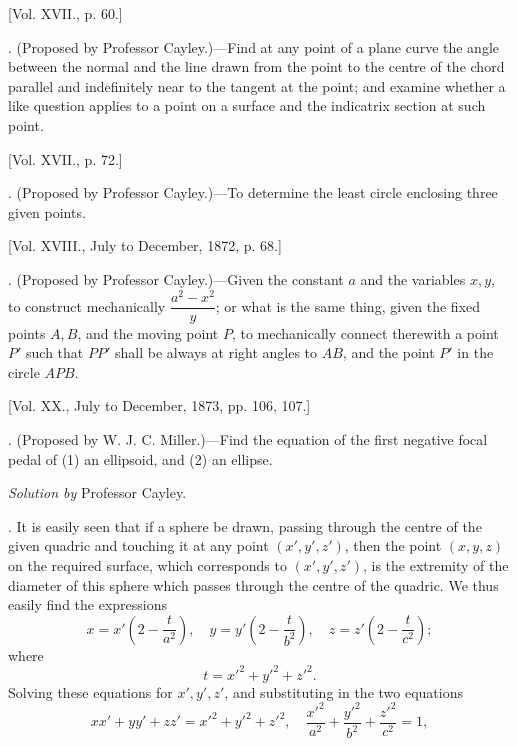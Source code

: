 \documentclass[10pt,twoside]{article}
\begin{document}
\fontsize{8.8}{10.1}\selectfont
\setcounter{page}{576}

\begin{center}
[Vol. XVII., p. 60.]
\end{center}

. (Proposed by Professor Cayley.)---Find at any point of a plane curve the angle between the normal and the line drawn from the point to the centre of the chord parallel and indefinitely near to the tangent at the point; and examine whether a like question applies to a point on a surface and the indicatrix section at such point.

\bigskip
\begin{center}
[Vol. XVII., p. 72.]
\end{center}

. (Proposed by Professor Cayley.)---To determine the least circle enclosing three given points.

\bigskip
\begin{center}
[Vol. XVIII., July to December, 1872, p. 68.]
\end{center}

. (Proposed by Professor Cayley.)---Given the constant \(a\) and the variables \(x,y\), to construct mechanically \(\dfrac{a^2-x^2}{y}\); or what is the same thing, given the fixed points \(A,B\), and the moving point \(P\), to mechanically connect therewith a point \(P'\) such that \(PP'\) shall be always at right angles to \(AB\), and the point \(P'\) in the circle \(APB\).

\bigskip
\begin{center}
[Vol. XX., July to December, 1873, pp. 106, 107.]
\end{center}

. (Proposed by W. J. C. Miller.)---Find the equation of the first negative focal pedal of (1) an ellipsoid, and (2) an ellipse.

\bigskip
\begin{center}
\textit{Solution by} Professor Cayley.
\end{center}

. It is easily seen that if a sphere be drawn, passing through the centre of the given quadric and touching it at any point \((x',y',z')\), then the point \((x,y,z)\) on the required surface, which corresponds to \((x',y',z')\), is the extremity of the diameter of this sphere which passes through the centre of the quadric. We thus easily find the expressions
\[
x=x'\left(2-\frac{t}{a^2}\right),\quad
y=y'\left(2-\frac{t}{b^2}\right),\quad
z=z'\left(2-\frac{t}{c^2}\right);
\]
where
\[
t=x'^2+y'^2+z'^2.
\]
Solving these equations for \(x',y',z'\), and substituting in the two equations
\[
xx'+yy'+zz'=x'^2+y'^2+z'^2,\quad
\frac{x'^2}{a^2}+\frac{y'^2}{b^2}+\frac{z'^2}{c^2}=1,
\]
\newpage
\end{document}
